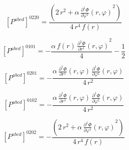 \documentclass[11pt]{article}
\begin{document}
\par\smallskip
\begin{dmath*}[breakdepth={5}]
\left[P^{abcd}\right]^{0220} = \frac{\left(2\,{r}^{2} + \alpha\,{\frac{\partial^{1} \Phi}{\partial \varphi^{1}}\!\left(r, \varphi\right)}^{2}\right)}{4\,{r}^{4}\,f\!\left(r\right)}
\end{dmath*}
\par\smallskip
\begin{dmath*}[breakdepth={5}]
\left[P^{abcd}\right]^{0101} = -\frac{\alpha\,f\!\left(r\right)\,{\frac{\partial^{1} \Phi}{\partial r^{1}}\!\left(r, \varphi\right)}^{2}}{4} - \frac{1}{2}
\end{dmath*}
\par\smallskip
\begin{dmath*}[breakdepth={5}]
\left[P^{abcd}\right]^{0201} = -\frac{\alpha\,\frac{\partial^{1} \Phi}{\partial r^{1}}\!\left(r, \varphi\right)\,\frac{\partial^{1} \Phi}{\partial \varphi^{1}}\!\left(r, \varphi\right)}{4\,{r}^{2}}
\end{dmath*}
\par\smallskip
\begin{dmath*}[breakdepth={5}]
\left[P^{abcd}\right]^{0102} = -\frac{\alpha\,\frac{\partial^{1} \Phi}{\partial r^{1}}\!\left(r, \varphi\right)\,\frac{\partial^{1} \Phi}{\partial \varphi^{1}}\!\left(r, \varphi\right)}{4\,{r}^{2}}
\end{dmath*}
\par\smallskip
\begin{dmath*}[breakdepth={5}]
\left[P^{abcd}\right]^{0202} = -\frac{\left(2\,{r}^{2} + \alpha\,{\frac{\partial^{1} \Phi}{\partial \varphi^{1}}\!\left(r, \varphi\right)}^{2}\right)}{4\,{r}^{4}\,f\!\left(r\right)}
\end{dmath*}
\par\smallskip
\end{document}
